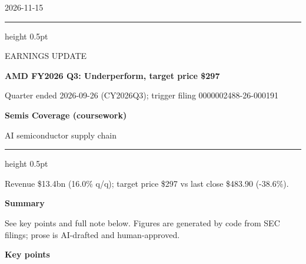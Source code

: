 \documentclass[a4paper,10pt]{article}
\newcommand{\ReportTitle}{AMD FY2026 Q3: Underperform, target price \$297}
\newcommand{\ReportType}{EARNINGS UPDATE}
\newcommand{\ReportDate}{2026-11-15}
\newcommand{\ReportScope}{Quarter ended 2026-09-26 (CY2026Q3); trigger filing 0000002488-26-000191}
\newcommand{\TeamName}{Semis Coverage (coursework)}
\newcommand{\DeskName}{AI semiconductor supply chain}
\newcommand{\KeyFinding}{Revenue \$13.4bn (16.0\% q/q); target price \$297 vs last close \$483.90 (-38.6\%).}
\begin{document}
\begin{minipage}[t]{0.70\textwidth}
\vspace{0pt}
{\small\ReportDate}\par\medskip
{\color{MemoBlue}\hrule height 0.5pt}\smallskip
{\large\ReportType}\par
{\LARGE\bfseries\ReportTitle}\par\medskip
\ReportScope
\end{minipage}\hfill
\begin{minipage}[t]{0.23\textwidth}
\vspace{0pt}\raggedleft
\colorbox{MemoBlue}{\parbox[c][19mm][c]{0.86\linewidth}{\centering\color{white}\bfseries\TeamName}}\par\medskip
\DeskName
\end{minipage}
\par\bigskip
{\color{MemoBlue}\hrule height 0.5pt}\medskip
{\large\KeyFinding}\par\bigskip

\begin{minipage}[t]{0.61\textwidth}
\vspace{0pt}\raggedright
\setlength{\parskip}{4pt}
\textbf{Summary}\par
See key points and full note below. Figures are generated by code from SEC filings; prose is AI-drafted and human-approved.
\end{minipage}\hfill
\begin{minipage}[t]{0.36\textwidth}
\vspace{0pt}\small
\medskip
{}
\end{minipage}
\par\bigskip



\par\smallskip\textbf{\color{MemoBlue}Key points}\par
\end{document}
